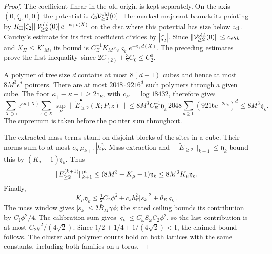 \documentclass[11pt,letterpaper,reqno]{amsart}
\theoremstyle{definition}
\theoremstyle{remark}
\begin{document}
\begin{proof}
The coefficient linear in the old origin is kept separately.
On the axis $(0,\zeta_2,0,0)$ the potential is
$\zeta_2\mathcal V^{\rm old}_{\ge2}(0)$.
The marked majorant bounds its pointing by
$K_\Pi|\zeta_2|\|\mathcal V^{\rm old}_{\ge2}(0)\|
e^{-\kappa_+d(X)}$ on the disc where this potential has
size below $c_{\rm cl}$. Cauchy's estimate for its first
coefficient divides by $|\zeta_2|$. Since
$\|\mathcal V^{\rm old}_{\ge2}(0)\|\le c_\psi\varsigma_k$
and $K_\Pi\le K'_M$, its bound is
$C_E^{-1}K_Mc_\psi\varsigma_ke^{-\kappa_+d(X)}$.
The preceding estimates prove the first inequality, since
$2C_{(2)}+\tfrac32C_0\le C_2^0$.

A polymer of tree size $d$ contains at most $8(d+1)$ cubes
and hence at most $8M^3e^d$ pointers. There are at most
$2048\cdot9216^d$ such polymers through a given cube.
The floor $\kappa_+-\kappa-1\ge2c_E$, with
$c_E=\log18432$, therefore gives
\[
 \sum_{X\supset\square}e^{\kappa d(X)}
      \sum_{z\in X}\sup_P
          \|\widetilde E^\bullet_{\ge2}(X;P;z)\|
 \le8M^3C_E^{-1}\mathfrak y_k\,
        2048\sum_{d\ge0}(9216e^{-2c_E})^d
 \le8M^3\mathfrak y_k.
\]
The supremum is taken before the pointer sum throughout.

The extracted mass terms stand on disjoint blocks of the
sites in a cube. Their norms sum to at most
$c_{\mathsf S}|\mu_{k+1}|h_F^2$. Mass extraction and
$\|\widetilde E_{\ge2}\|_{k+1}\le\mathfrak y_k$ bound
this by $(K_\mu-1)\mathfrak y_k$. Thus
\[
 \|E^{(k+1)}_{\ge2}\|^{\rm pt}_{k+1}
 \le(8M^3+K_\mu-1)\mathfrak y_k
 \le8M^3K_\mu\mathfrak y_k.
\]
Finally,
\[
 K_\mu\mathfrak y_k
 \le\tfrac12C_2\phi^2+c_sh_F^2|s_k|^2
                                      +\theta_E\varsigma_k.
\]
The mass window gives $|s_k|\le2\bar B_M\gamma\phi$;
the stated ceiling bounds its contribution by
$C_2\phi^2/4$. The calibration sum gives
$\varsigma_k\le C_\omega S_\omega C_2\phi^2$, so the
last contribution is at most $C_2\phi^2/(4\sqrt2)$.
Since $1/2+1/4+1/(4\sqrt2)<1$, the claimed bound follows.
The cluster and polymer counts hold on both lattices with
the same constants, including both families on a torus.
\end{proof}
\end{document}
